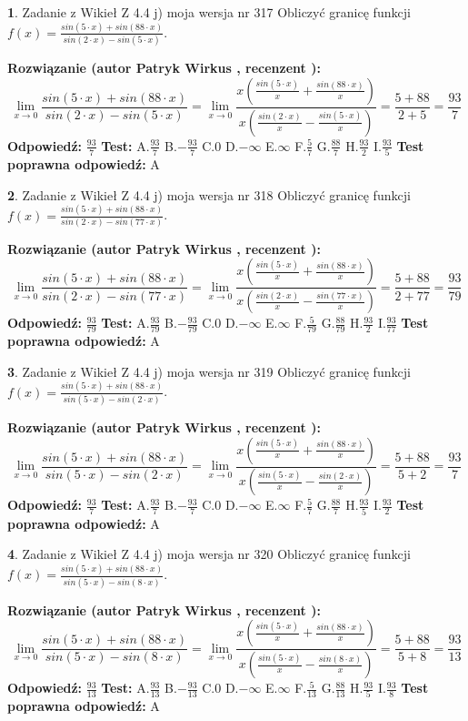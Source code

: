 \documentclass[12pt, a4paper]{article}
\theoremstyle{definition} %
\newtheorem{zad}{}
\newcommand{\zadStart}[1]{\begin{zad}#1\newline}
\newcommand{\zadStop}{\end{zad}}
\newcommand{\rozwStart}[2]{\noindent \textbf{Rozwiązanie (autor #1 , recenzent #2): }\newline}
\newcommand{\rozwStop}{\newline}
\newcommand{\odpStart}{\noindent \textbf{Odpowiedź:}\newline}
\newcommand{\odpStop}{\newline}
\newcommand{\testStart}{\noindent \textbf{Test:}\newline}
\newcommand{\testStop}{\newline}
\newcommand{\kluczStart}{\noindent \textbf{Test poprawna odpowiedź:}\newline}
\newcommand{\kluczStop}{\newline}
\begin{document}
\zadStart{Zadanie z Wikieł Z 4.4 j) moja wersja nr 317}
Obliczyć granicę funkcji $f(x)=\frac{sin(5\cdot x) +sin(88\cdot x)}{sin(2\cdot x) -sin(5\cdot x)}$.
\zadStop
\rozwStart{Patryk Wirkus}{}
$$\lim\limits_{x\to 0}\frac{sin(5\cdot x) +sin(88\cdot x)}{sin(2\cdot x) -sin(5\cdot x)}=\lim\limits_{x\to 0}\frac{x(\frac{sin(5\cdot x)}{x}+\frac{sin(88\cdot x)}{x})}{x(\frac{sin(2\cdot x)}{x}-\frac{sin(5\cdot x)}{x})}=\frac{5+88}{2+5} = \frac{93}{7}$$
\rozwStop
\odpStart
$\frac{93}{7}$
\odpStop
\testStart
A.$\frac{93}{7}$
B.$-\frac{93}{7}$
C.$0$
D.$-\infty$
E.$\infty$
F.$\frac{5}{7}$
G.$\frac{88}{7}$
H.$\frac{93}{2}$
I.$\frac{93}{5}$
\testStop
\kluczStart
A
\kluczStop



\zadStart{Zadanie z Wikieł Z 4.4 j) moja wersja nr 318}
Obliczyć granicę funkcji $f(x)=\frac{sin(5\cdot x) +sin(88\cdot x)}{sin(2\cdot x) -sin(77\cdot x)}$.
\zadStop
\rozwStart{Patryk Wirkus}{}
$$\lim\limits_{x\to 0}\frac{sin(5\cdot x) +sin(88\cdot x)}{sin(2\cdot x) -sin(77\cdot x)}=\lim\limits_{x\to 0}\frac{x(\frac{sin(5\cdot x)}{x}+\frac{sin(88\cdot x)}{x})}{x(\frac{sin(2\cdot x)}{x}-\frac{sin(77\cdot x)}{x})}=\frac{5+88}{2+77} = \frac{93}{79}$$
\rozwStop
\odpStart
$\frac{93}{79}$
\odpStop
\testStart
A.$\frac{93}{79}$
B.$-\frac{93}{79}$
C.$0$
D.$-\infty$
E.$\infty$
F.$\frac{5}{79}$
G.$\frac{88}{79}$
H.$\frac{93}{2}$
I.$\frac{93}{77}$
\testStop
\kluczStart
A
\kluczStop



\zadStart{Zadanie z Wikieł Z 4.4 j) moja wersja nr 319}
Obliczyć granicę funkcji $f(x)=\frac{sin(5\cdot x) +sin(88\cdot x)}{sin(5\cdot x) -sin(2\cdot x)}$.
\zadStop
\rozwStart{Patryk Wirkus}{}
$$\lim\limits_{x\to 0}\frac{sin(5\cdot x) +sin(88\cdot x)}{sin(5\cdot x) -sin(2\cdot x)}=\lim\limits_{x\to 0}\frac{x(\frac{sin(5\cdot x)}{x}+\frac{sin(88\cdot x)}{x})}{x(\frac{sin(5\cdot x)}{x}-\frac{sin(2\cdot x)}{x})}=\frac{5+88}{5+2} = \frac{93}{7}$$
\rozwStop
\odpStart
$\frac{93}{7}$
\odpStop
\testStart
A.$\frac{93}{7}$
B.$-\frac{93}{7}$
C.$0$
D.$-\infty$
E.$\infty$
F.$\frac{5}{7}$
G.$\frac{88}{7}$
H.$\frac{93}{5}$
I.$\frac{93}{2}$
\testStop
\kluczStart
A
\kluczStop



\zadStart{Zadanie z Wikieł Z 4.4 j) moja wersja nr 320}
Obliczyć granicę funkcji $f(x)=\frac{sin(5\cdot x) +sin(88\cdot x)}{sin(5\cdot x) -sin(8\cdot x)}$.
\zadStop
\rozwStart{Patryk Wirkus}{}
$$\lim\limits_{x\to 0}\frac{sin(5\cdot x) +sin(88\cdot x)}{sin(5\cdot x) -sin(8\cdot x)}=\lim\limits_{x\to 0}\frac{x(\frac{sin(5\cdot x)}{x}+\frac{sin(88\cdot x)}{x})}{x(\frac{sin(5\cdot x)}{x}-\frac{sin(8\cdot x)}{x})}=\frac{5+88}{5+8} = \frac{93}{13}$$
\rozwStop
\odpStart
$\frac{93}{13}$
\odpStop
\testStart
A.$\frac{93}{13}$
B.$-\frac{93}{13}$
C.$0$
D.$-\infty$
E.$\infty$
F.$\frac{5}{13}$
G.$\frac{88}{13}$
H.$\frac{93}{5}$
I.$\frac{93}{8}$
\testStop
\kluczStart
A
\kluczStop
\end{document}
